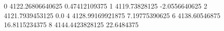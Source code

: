 0 4122.26806640625 0.47412109375
1 4119.73828125 -2.0556640625
2 4121.7939453125 0.0
4 4128.99169921875 7.19775390625
6 4138.60546875 16.8115234375
8 4144.4423828125 22.6484375
